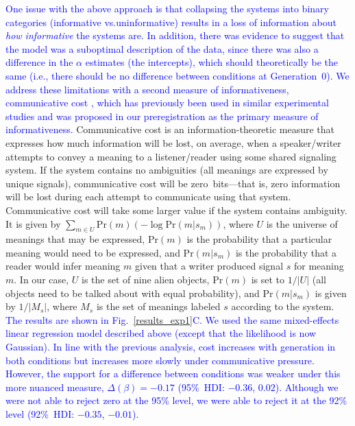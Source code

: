 \documentclass[doc,biblatex]{apa7}
\newcommand\newmaterial[1]{\textcolor{blue}{#1}}
\begin{document}
\newmaterial{One issue with the above approach is that collapsing the systems into binary categories (informative vs.\@ uninformative) results in a loss of information about \textit{how informative} the systems are. In addition, there was evidence to suggest that the model was a suboptimal description of the data, since there was also a difference in the $\alpha$ estimates (the intercepts), which should theoretically be the same (i.e., there should be no difference between conditions at Generation~0). We address these limitations with a second measure of informativeness, communicative cost \parencite{KempRegier:2012, Kemp:2018, Regier:2015}, which has previously been used in similar experimental studies \parencite{Carr:2020, Carstensen:2015, Smith:2020} and was proposed in our preregistration as the primary measure of informativeness.} Communicative cost is an information-theoretic measure that expresses how much information will be lost, on average, when a speaker/writer attempts to convey a meaning to a listener/reader using some shared signaling system. If the system contains no ambiguities (all meanings are expressed by unique signals), communicative cost will be zero~bits---that is, zero information will be lost during each attempt to communicate using that system. Communicative cost will take some larger value if the system contains ambiguity. It is given by $\sum_{m \in U} \mathrm{Pr}(m) ( -\log \mathrm{Pr}(m|s_m) )$, where $U$ is the universe of meanings that may be expressed, $\mathrm{Pr}(m)$ is the probability that a particular meaning would need to be expressed, and $\mathrm{Pr}(m|s_m)$ is the probability that a reader would infer meaning $m$ given that a writer produced signal $s$ for meaning $m$. In our case, $U$ is the set of nine alien objects, $\mathrm{Pr}(m)$ is set to $1/|U|$ (all objects need to be talked about with equal probability), and $\mathrm{Pr}(m|s_m)$ is given by $1/|M_s|$, where $M_s$ is the set of meanings labeled $s$ according to the system. \newmaterial{The results are shown in Fig.~\ref{results_exp1}C. We used the same mixed-effects linear regression model described above (except that the likelihood is now Gaussian). In line with the previous analysis, cost increases with generation in both conditions but increases more slowly under communicative pressure. However, the support for a difference between conditions was weaker under this more nuanced measure, $\Delta(\beta) = -0.17$ (95\%~HDI: $-0.36$, $0.02$). Although we were not able to reject zero at the 95\% level, we were able to reject it at the 92\% level (92\%~HDI: $-0.35$, $-0.01$).}
\end{document}
